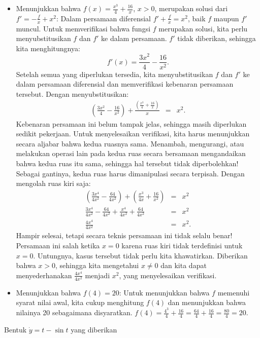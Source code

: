 \begin{description}
\begin{itemize}
\item Menunjukkan bahwa $f(x)=\frac{x^{3}}{4}+\frac{16}{x}$, $x>0$, merupakan
solusi dari $f'=-\frac{f}{x}+x^{2}$: Dalam persamaan diferensial
$f'+\frac{f}{x}=x^{2}$, baik $f$ maupun $f'$ muncul. Untuk memverifikasi
bahwa fungsi $f$ merupakan solusi, kita perlu menyubstitusikan $f$
dan $f'$ ke dalam persamaan. $f'$ tidak diberikan, sehingga kita
menghitungnya:
\[
f'(x)=\frac{3x^{2}}{4}-\frac{16}{x^{2}}.
\]
Setelah semua yang diperlukan tersedia, kita menyubstitusikan $f$
dan $f'$ ke dalam persamaan diferensial dan memverifikasi kebenaran
persamaan tersebut. Dengan menyubstitusikan:
\begin{eqnarray*}
\left(\frac{3x^{2}}{4}-\frac{16}{x^{2}}\right)+\frac{\left(\frac{x^{3}}{4}+\frac{16}{x}\right)}{x} & = & x^{2}.
\end{eqnarray*}
Kebenaran persamaan ini belum tampak jelas, sehingga masih diperlukan
sedikit pekerjaan. Untuk menyelesaikan verifikasi, kita harus menunjukkan
secara aljabar bahwa kedua ruasnya sama. Menambah, mengurangi, atau
melakukan operasi lain pada kedua ruas secara bersamaan mengandaikan
bahwa kedua ruas itu sama, sehingga hal tersebut tidak diperbolehkan!
Sebagai gantinya, kedua ruas harus dimanipulasi secara terpisah. Dengan
mengolah ruas kiri saja:
\begin{eqnarray*}
\left(\frac{3x^{4}}{4x^{2}}-\frac{64}{4x^{2}}\right)+\left(\frac{x^{3}}{4x}+\frac{16}{x^{2}}\right) & = & x^{2}\\
\frac{3x^{4}}{4x^{2}}-\frac{64}{4x^{2}}+\frac{x^{4}}{4x^{2}}+\frac{64}{4x^{2}} & = & x^{2}\\
\frac{4x^{4}}{4x^{2}} & = & x^{2}.
\end{eqnarray*}
Hampir selesai, tetapi secara teknis persamaan ini tidak selalu benar!
Persamaan ini salah ketika $x=0$ karena ruas kiri tidak terdefinisi
untuk $x=0$. Untungnya, kasus tersebut tidak perlu kita khawatirkan.
Diberikan bahwa $x>0$, sehingga kita mengetahui $x\neq0$ dan kita
dapat menyederhanakan $\frac{4x^{4}}{4x^{2}}$ menjadi $x^{2}$, yang
menyelesaikan verifikasi.
\item Menunjukkan bahwa $f(4)=20$: Untuk menunjukkan bahwa $f$ memenuhi
syarat nilai awal, kita cukup menghitung $f(4)$ dan menunjukkan bahwa
nilainya 20 sebagaimana disyaratkan. $f(4)=\frac{4^{3}}{4}+\frac{16}{4}=\frac{64}{4}+\frac{16}{4}=\frac{80}{4}=20$.
\end{itemize}
\item [{\ref{exc:odePendulum-13}:}] Bentuk $\dot{y}=t-\sin t$ yang diberikan

\end{description}
